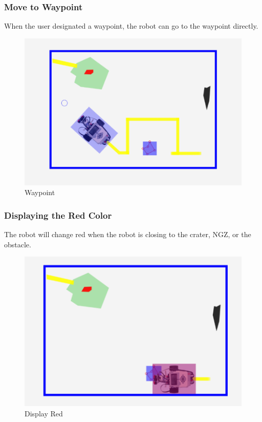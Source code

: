 \documentclass[10pt,a4paper,titlepage]{article}
\begin{document}
  \subsubsection{  Move to Waypoint} 
When the user designated a waypoint, the robot can go to the waypoint directly.
  \begin{figure}[H] 
  \includegraphics[width=\linewidth]{waypoint.png}  %
  \caption{Waypoint} 
  \label{fig:Waypoint}               
  \end{figure} 
  
  
  
	\subsubsection{  Displaying the Red Color} 
The robot will change red when the robot is closing to the crater, NGZ, or the obstacle.
  \begin{figure}[H] 
  \includegraphics[width=\linewidth]{red.png}  %
  \caption{Display Red} 
  \label{fig:Display Red}               
  \end{figure} 
   
\end{document}
